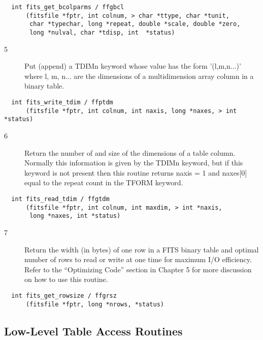 \begin{verbatim}
  int fits_get_bcolparms / ffgbcl
      (fitsfile *fptr, int colnum, > char *ttype, char *tunit,
       char *typechar, long *repeat, double *scale, double *zero,
       long *nulval, char *tdisp, int  *status)
\end{verbatim}

\begin{description}
\item[ 5] Put (append) a TDIMn keyword whose value has the form '(l,m,n...)'
    where l, m, n... are the dimensions of a multidimension array
   column in a binary table.
\end{description}

\begin{verbatim}
  int fits_write_tdim / ffptdm
      (fitsfile *fptr, int colnum, int naxis, long *naxes, > int *status)
\end{verbatim}

\begin{description}
\item[ 6] Return the number of and size of the dimensions of a table column.
    Normally this information is given by the TDIMn keyword, but if
    this keyword is not present then this routine returns naxis = 1
   and naxes[0] equal to the repeat count in the TFORM keyword.
\end{description}

\begin{verbatim}
  int fits_read_tdim / ffgtdm
      (fitsfile *fptr, int colnum, int maxdim, > int *naxis,
       long *naxes, int *status)
\end{verbatim}

\begin{description}
\item[ 7] Return the width (in bytes) of one row in a FITS binary table and optimal number
    of rows to read or write at one time for maximum I/O efficiency.  Refer to the
    ``Optimizing Code'' section in Chapter 5 for more discussion on how
   to use this routine.
\end{description}

\begin{verbatim}
  int fits_get_rowsize / ffgrsz
      (fitsfile *fptr, long *nrows, *status)
\end{verbatim}


\subsection{Low-Level Table Access Routines \label{FFGTBB}}

